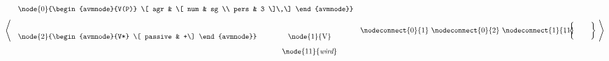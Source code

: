 \begin{math}\left <
\mbox{
\begin{tabular}{cc}
\multicolumn{2}{c}{\node{0}{\begin{avmnode}{V(P)}
\[ agr & \[ num & sg \\ pers & 3 \]\,\]
\end{avmnode}}} \\[6ex]
\node{2}{\begin{avmnode}{V*}
\[ passive & +\]
\end{avmnode}} & \node{1}{V} \\[2ex]
& \node{11}{{\it wird}}
\end{tabular}
\nodeconnect{0}{1}
\nodeconnect{0}{2}
\nodeconnect{1}{11}
\hspace{-2em} , %
$\left \{
\mbox{
\begin{tabular}{c}
~ \\ ~
\end{tabular}
}
\right \}$
}
\right >\end{math}


